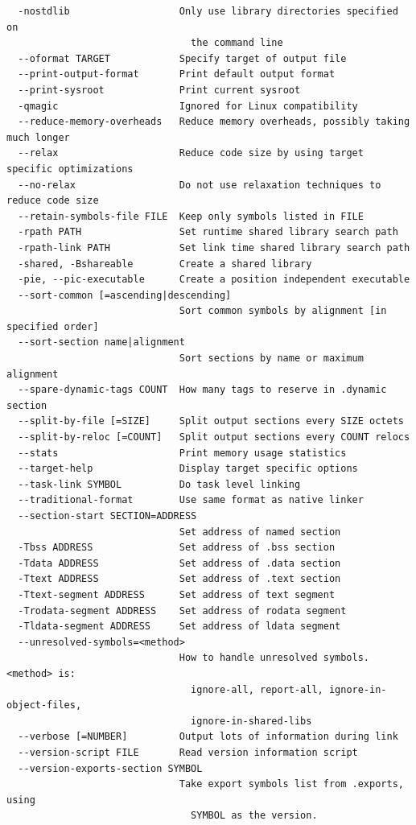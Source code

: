 \documentclass{article}
\begin{document}
\begin{lstlisting}
  -nostdlib                   Only use library directories specified on
                                the command line
  --oformat TARGET            Specify target of output file
  --print-output-format       Print default output format
  --print-sysroot             Print current sysroot
  -qmagic                     Ignored for Linux compatibility
  --reduce-memory-overheads   Reduce memory overheads, possibly taking much longer
  --relax                     Reduce code size by using target specific optimizations
  --no-relax                  Do not use relaxation techniques to reduce code size
  --retain-symbols-file FILE  Keep only symbols listed in FILE
  -rpath PATH                 Set runtime shared library search path
  -rpath-link PATH            Set link time shared library search path
  -shared, -Bshareable        Create a shared library
  -pie, --pic-executable      Create a position independent executable
  --sort-common [=ascending|descending]
                              Sort common symbols by alignment [in specified order]
  --sort-section name|alignment
                              Sort sections by name or maximum alignment
  --spare-dynamic-tags COUNT  How many tags to reserve in .dynamic section
  --split-by-file [=SIZE]     Split output sections every SIZE octets
  --split-by-reloc [=COUNT]   Split output sections every COUNT relocs
  --stats                     Print memory usage statistics
  --target-help               Display target specific options
  --task-link SYMBOL          Do task level linking
  --traditional-format        Use same format as native linker
  --section-start SECTION=ADDRESS
                              Set address of named section
  -Tbss ADDRESS               Set address of .bss section
  -Tdata ADDRESS              Set address of .data section
  -Ttext ADDRESS              Set address of .text section
  -Ttext-segment ADDRESS      Set address of text segment
  -Trodata-segment ADDRESS    Set address of rodata segment
  -Tldata-segment ADDRESS     Set address of ldata segment
  --unresolved-symbols=<method>
                              How to handle unresolved symbols.  <method> is:
                                ignore-all, report-all, ignore-in-object-files,
                                ignore-in-shared-libs
  --verbose [=NUMBER]         Output lots of information during link
  --version-script FILE       Read version information script
  --version-exports-section SYMBOL
                              Take export symbols list from .exports, using
                                SYMBOL as the version.

\end{lstlisting}
\end{document}
